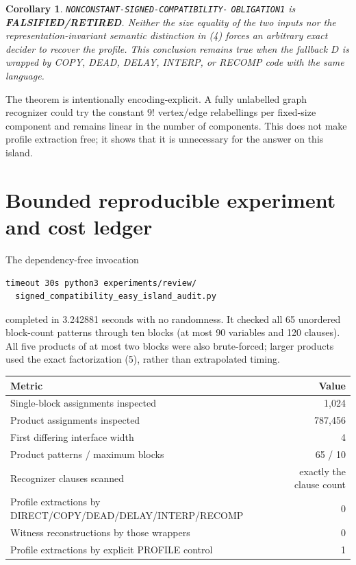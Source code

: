 \documentclass[11pt]{article}
\newtheorem{corollary}{Corollary}
\newcommand{\RETIRED}{\textbf{FALSIFIED/RETIRED}}
\begin{document}
\begin{corollary}
\texttt{NONCONSTANT-SIGNED-COMPATIBILITY-}\allowbreak
\texttt{OBLIGATION1} is \RETIRED.  Neither
the size equality of the two inputs nor the representation-invariant semantic
distinction in (4) forces an arbitrary exact decider to recover the profile.
This conclusion remains true when the fallback $D$ is wrapped by COPY, DEAD,
DELAY, INTERP, or RECOMP code with the same language.
\end{corollary}

The theorem is intentionally encoding-explicit.  A fully unlabelled graph
recognizer could try the constant $9!$ vertex/edge relabellings per fixed-size
component and remains linear in the number of components.  This does not make
profile extraction free; it shows that it is unnecessary for the answer on
this island.

\section{Bounded reproducible experiment and cost ledger}

The dependency-free invocation
\begin{verbatim}
timeout 30s python3 experiments/review/
  signed_compatibility_easy_island_audit.py
\end{verbatim}
completed in 3.242881 seconds with no randomness.  It checked all 65 unordered
block-count patterns through ten blocks (at most 90 variables and 120 clauses).
All five products of at most two blocks were also brute-forced; larger products
used the exact factorization (5), rather than extrapolated timing.

\begin{center}\small
\begin{tabular}{@{}lr@{}}
\toprule
Metric & Value\\ \midrule
Single-block assignments inspected & 1,024\\
Product assignments inspected & 787,456\\
First differing interface width & 4\\
Product patterns / maximum blocks & 65 / 10\\
Recognizer clauses scanned & exactly the clause count\\
Profile extractions by DIRECT/COPY/DEAD/DELAY/INTERP/RECOMP & 0\\
Witness reconstructions by those wrappers & 0\\
Profile extractions by explicit PROFILE control & 1\\
\bottomrule
\end{tabular}
\end{center}
\end{document}
